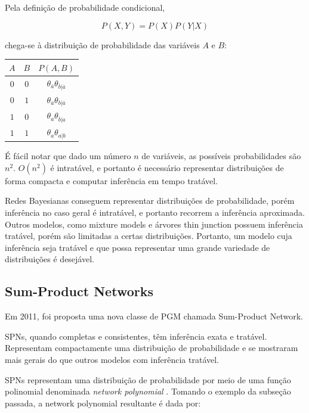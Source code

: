 \documentclass[a4paper,10pt]{article}
\theoremstyle{plain}
\begin{document}
Pela definição de probabilidade condicional,

\begin{equation*}
  P(X, Y) = P(X)P(Y|X)
\end{equation*}

chega-se à distribuição de probabilidade das variáveis $A$ e $B$:

\begin{table}[h]
  \begin{center}
    \begin{tabular}{c c | c}
      $A$ & $B$ & $P(A, B)$ \\
      \hline
      $0$ & $0$ & $\theta_{\overline{a}}\theta_{\overline{b}|\overline{a}}$ \\
      $0$ & $1$ & $\theta_{\overline{a}}\theta_{b|\overline{a}}$ \\
      $1$ & $0$ & $\theta_a\theta_{\overline{b}|a}$ \\
      $1$ & $1$ & $\theta_a\theta_{a|b}$ \\
    \end{tabular}
  \end{center}
\end{table}

É fácil notar que dado um número $n$ de variáveis, as possíveis probabilidades são $n^2$. $O(n^2)$
é intratável, e portanto é necessário representar distribuições de forma compacta e computar
inferência em tempo tratável.

Redes Bayesianas conseguem representar distribuições de probabilidade, porém inferência no caso
geral é intratável, e portanto recorrem a inferência aproximada. Outros modelos, como mixture
models e árvores thin junction possuem inferência tratável, porém são limitadas a certas
distribuições. Portanto, um modelo cuja inferência seja tratável e que possa representar uma grande
variedade de distribuições é desejável.

\subsection{Sum-Product Networks}

Em 2011, foi proposta\cite{poon-domingos} uma nova classe de PGM chamada Sum-Product Network.

SPNs, quando completas e consistentes, têm inferência exata e tratável. Representam compactamente
uma distribuição de probabilidade e se mostraram mais gerais do que outros modelos com inferência
tratável.

SPNs representam uma distribuição de probabilidade por meio de uma função polinomial denominada
\textit{network polynomial} \cite{bayes-net-darwiche, poon-domingos}. Tomando o exemplo da
subseção passada, a network polynomial resultante é dada por:
\end{document}
